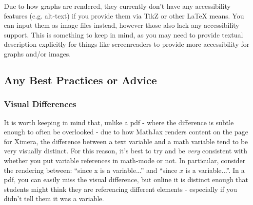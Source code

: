 \documentclass{ximera}
\begin{document}
        Due to how graphs are rendered, they currently don't have any accessibility features (e.g. alt-text) if you provide them via TikZ or other LaTeX means. You can input them as image files instead, however those also lack any accessibility support. This is something to keep in mind, as you may need to provide textual description explicitly for things like screenreaders to provide more accessibility for graphs and/or images.
     
     
     
    \subsection*{Any Best Practices or Advice}
         
        \subsubsection*{Visual Differences}
            It is worth keeping in mind that, unlike a pdf - where the difference is subtle enough to often be overlooked - due to how MathJax renders content on the page for Ximera, the difference between a text variable and a math variable tend to be very visually distinct. For this reason, it's best to try and be \textit{very} consistent with whether you put variable references in math-mode or not. In particular, consider the rendering between: ``since x is a variable...'' and ``since $x$ is a variable...''. In a pdf, you can easily miss the visual difference, but online it is distinct enough that students might think they are referencing different elements - especially if you didn't tell them it was a variable.
         
\end{document}

